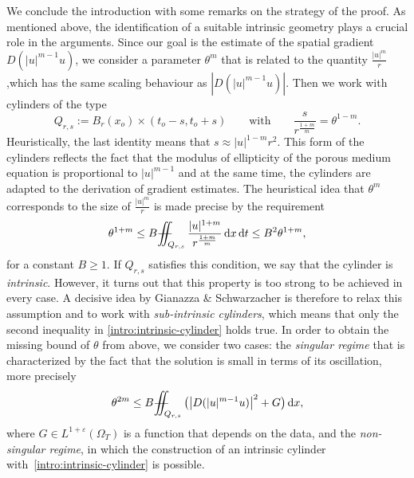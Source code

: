 \documentclass[a4paper, 10pt, american]{amsart}
\numberwithin{theorem}{section}
\numberwithin{equation}{section}
\newcommand{\dx}{\,\mathrm{d}x}
\newcommand{\dt}{\,\mathrm{d}t}
\newcommand{\eps}{\varepsilon}
\def\Xiint#1{\mathchoice
    {\XXiint\displaystyle\textstyle{#1}}%
    {\XXiint\textstyle\scriptstyle{#1}}%
    {\XXiint\scriptstyle\scriptscriptstyle{#1}}%
    {\XXiint\scriptscriptstyle\scriptscriptstyle{#1}}%
    \!\iint}
\def\XXiint#1#2#3{\setbox0=\hbox{$#1{#2#3}{\iint}$}
    \vcenter{\hbox{$#2#3$}}\kern-0.5\wd0}
\def\biint{\Xiint{-\!-}}
\begin{document}
We conclude the introduction with some remarks on the strategy of the proof. As
mentioned above, the identification of a suitable intrinsic geometry
plays a crucial role in the arguments. Since our goal is the estimate of
the spatial gradient $D(|u|^{m-1}u)$, we consider a
parameter $\theta^m$ that is related to the quantity
$\frac{|u|^m}r$,which has the same scaling behaviour as
$|D(|u|^{m-1}u)|$. Then we work with cylinders of the type
\begin{equation}\label{ratio-cylinders}
  Q_{r,s}:=B_{r}(x_o)\times(t_o-s,t_o+s)
  \qquad\mbox{with}\qquad
  \frac{s}{r^{\frac{1+m}{m}}}=\theta^{1-m}.
\end{equation}
Heuristically, the last identity means that $s\approx|u|^{1-m}r^2$. 
This form of the cylinders reflects the fact that the modulus of
ellipticity of the porous medium equation is proportional to
$|u|^{m-1}$ and at the same time, the cylinders are adapted to the derivation of
gradient estimates. 
The heuristical idea that $\theta^m$ corresponds to the size of
$\frac{|u|^m}{r}$ is made precise by the requirement
\begin{equation}\label{intro:intrinsic-cylinder}
  \theta^{1+m}
  \le
  B\biint_{Q_{r,s}}\frac{|u|^{1+m}}{r^{\frac{1+m}{m}}}\dx\dt
  \le
  B^2\theta^{1+m},
\end{equation}
for a constant $B\ge1$. 
If $Q_{r,s}$ satisfies this condition, we say that the cylinder is
\emph{intrinsic}. However, it turns out that this property is too strong
to be achieved in every case. 
A decisive idea by Gianazza \& Schwarzacher \cite{Gianazza-Schwarzacher}
is therefore to relax this assumption and to work with \emph{sub-intrinsic
  cylinders},  which means that only the second inequality in
\eqref{intro:intrinsic-cylinder} holds true. In order to obtain the
missing bound of $\theta$
from above, we consider two cases: the \emph{singular regime}
that is characterized by the fact that the solution is small in terms
of its oscillation, more precisely
\begin{equation}\label{intro:singular}
  \theta^{2m}
  \le
  B\biint_{Q_{r,s}}\big(\big|D(|u|^{m-1}u)\big|^2+G\big)\dx,
\end{equation}
where $G\in L^{1+\eps}(\Omega_T)$ is a function that depends on the data, and the
\emph{non-singular regime}, in which the construction of an intrinsic
cylinder with~\eqref{intro:intrinsic-cylinder} is possible.
\end{document}
